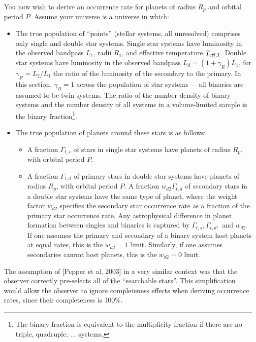 \documentclass{emulateapj}
\begin{document}
You now wish to derive an occurrence rate for planets of radius $R_p$ and 
orbital period $P$.
Assume your universe is a universe in which:
\begin{itemize}
	\item The true population of ``points'' (stellar systems, all unresolved) 
	comprises only single and double star systems. Single star systems have 
	luminosity in the observed bandpass $L_1$, radii $R_1$, and effective 
	temperature $T_{\rm eff,1}$.
	Double star systems have luminosity in the observed bandpass $L_d = 
	(1+\gamma_R)L_1$, for $\gamma_R = L_2/L_1$ the ratio of the luminosity of 
	the secondary to the primary. 
	In this section, $\gamma_R=1$ across the population 
	of star systems~--~all binaries are assumed to be twin systems.
	The ratio of the number density of binary systems and the number density of 
	all systems in a volume-limited sample is the binary fraction\footnote{The 
	binary fraction is equivalent to the multiplicity fraction if there are 
	no triple, quadruple, $\ldots$ systems.}.
	\item The true population of planets around these stars is as follows:
	\begin{itemize}
	\item A fraction $\Gamma_{t,s}$ of stars in single star systems 
	have planets of radius $R_p$, with orbital period $P$.
	\item A fraction $\Gamma_{t,d}$ of primary stars in double star 
	systems have planets of radius $R_p$, with orbital period $P$. 
	A fraction $w_{d2}\Gamma_{t,d}$ of secondary stars in a double star 
	systems have the same type of 
	planet, where the weight factor $w_{d2}$ specifies the secondary star 
	occurrence rate as a fraction	of the primary star occurrence rate.
	Any astrophysical difference in planet formation between singles and 
	binaries is captured by $\Gamma_{t,s}, \Gamma_{t,d},$ and $w_{d2}$.
	If one assumes the primary and secondary of a binary system host planets at 
	equal rates, this is the $w_{d2}=1$ limit.
	Similarly, if one assumes  secondaries 
	cannot host planets, this is the $w_{d2}=0$ limit.
	\end{itemize}
\end{itemize}

The assumption of [Pepper et al, 2003] in a very similar context was that the 
observer correctly pre-selects all of the ``searchable stars''.
This simplification would allow the observer to ignore 
completeness effects when deriving occurrence rates, since their completeness 
is 100\%.
\end{document}
